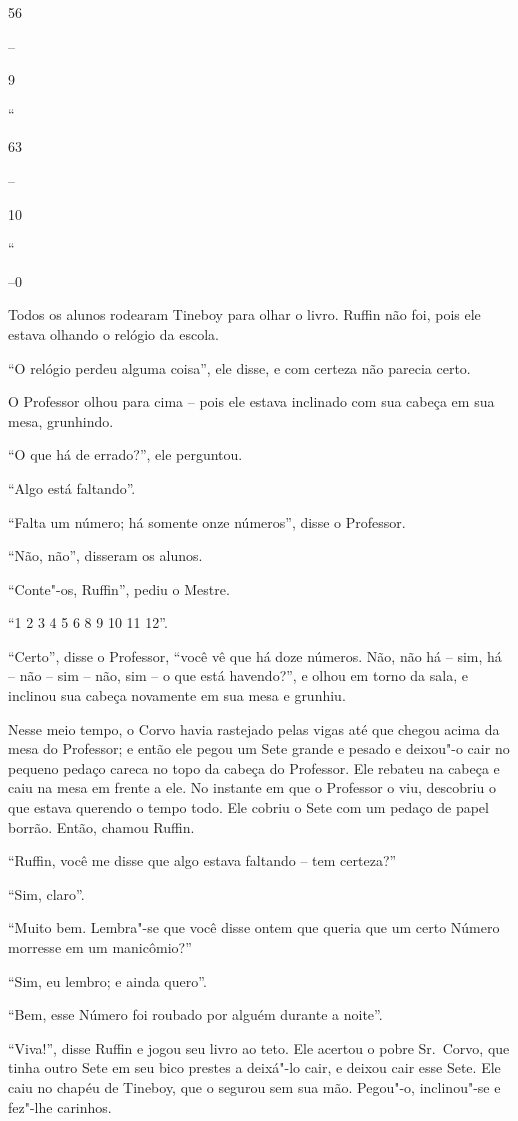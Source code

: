 56

--

9

``

63

--

10

``

--0

Todos os alunos rodearam Tineboy para olhar o livro. Ruffin não foi,
pois ele estava olhando o relógio da escola.

``O relógio perdeu alguma coisa'', ele disse, e com certeza não parecia
certo.

O Professor olhou para cima -- pois ele estava inclinado com sua cabeça
em sua mesa, grunhindo.

``O que há de errado?'', ele perguntou.

``Algo está faltando''.

``Falta um número; há somente onze números'', disse o Professor.

``Não, não'', disseram os alunos.

``Conte"-os, Ruffin'', pediu o Mestre.

``1 2 3 4 5 6 8 9 10 11 12''.

``Certo'', disse o Professor, ``você vê que há doze números. Não, não há
-- sim, há -- não -- sim -- não, sim -- o que está havendo?'', e olhou
em torno da sala, e inclinou sua cabeça novamente em sua mesa e grunhiu.

Nesse meio tempo, o Corvo havia rastejado pelas vigas até que chegou
acima da mesa do Professor; e então ele pegou um Sete grande e pesado e
deixou"-o cair no pequeno pedaço careca no topo da cabeça do Professor.
Ele rebateu na cabeça e caiu na mesa em frente a ele. No instante em que
o Professor o viu, descobriu o que estava querendo o tempo todo. Ele
cobriu o Sete com um pedaço de papel borrão. Então, chamou Ruffin.

``Ruffin, você me disse que algo estava faltando -- tem certeza?''

``Sim, claro''.

``Muito bem. Lembra"-se que você disse ontem que queria que um certo
Número morresse em um manicômio?''

``Sim, eu lembro; e ainda quero''.

``Bem, esse Número foi roubado por alguém durante a noite''.

``Viva!'', disse Ruffin e jogou seu livro ao teto. Ele acertou o pobre
Sr.~Corvo, que tinha outro Sete em seu bico prestes a deixá"-lo cair, e
deixou cair esse Sete. Ele caiu no chapéu de Tineboy, que o segurou sem
sua mão. Pegou"-o, inclinou"-se e fez"-lhe carinhos.

